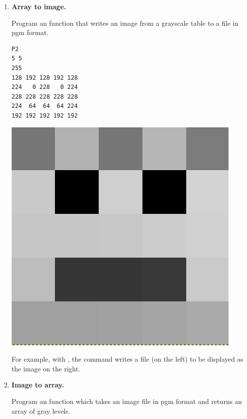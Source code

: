 \documentclass[11pt,class=report,crop=false]{standalone}
\begin{document}
\begin{activite}



\begin{enumerate}
  \item \textbf{Array to image.}
  
  Program an  function that writes an image  from a grayscale table to a file in \og{}pgm\fg{} format.
  
\begin{center}
\begin{minipage}{0.3\textwidth}
\begin{lstlisting}
P2
5 5
255
128 192 128 192 128
224   0 228   0 224
228 228 228 228 228 
224  64  64  64 224 
192 192 192 192 192 
\end{lstlisting}
\end{minipage}
\begin{minipage}{0.3\textwidth}
\begin{center}
\includegraphics[scale=\myscale,scale=0.15]{input/ecran-test-pgm}
\end{center}
\end{minipage}
\end{center}
For example, with , the  command writes a  file (on the left) to be displayed as the image on the right.

  
  
  \item \textbf{Image to array.} 
  
  Program an  function 
  which takes an image file in \og{}pgm\fg{} format and returns an array of gray levels.
\end{enumerate}

\end{activite}
\end{document}
